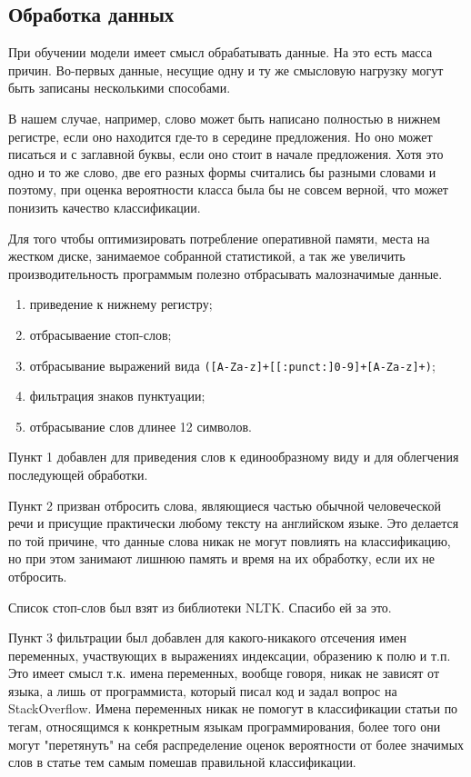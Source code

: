 \documentclass[12pt,a4paper]{scrartcl}
\begin{document}
\subsection*{Обработка данных}

При обучении модели имеет смысл обрабатывать данные. На это есть масса причин.
Во-первых данные, несущие одну и ту же смысловую нагрузку могут быть записаны несколькими способами. 

В нашем случае, например, слово может быть написано полностью в нижнем регистре, если оно находится где-то в середине предложения. Но оно может писаться и с заглавной буквы, если оно стоит в начале предложения. Хотя это одно и то же слово, две его разных формы считались бы разными словами и поэтому, при оценка вероятности класса была бы не совсем верной, что может понизить качество классификации.

Для того чтобы оптимизировать потребление оперативной памяти, места на жестком диске, занимаемое собранной статистикой, а так же увеличить производительность программым полезно отбрасывать малозначимые данные.

\begin{enumerate}
    \item приведение к нижнему регистру;
    \item отбрасываение стоп-слов;
    \item отбрасывание выражений вида \verb|([A-Za-z]+[[:punct:]0-9]+[A-Za-z]+)|;
    \item фильтрация знаков пунктуации;
    \item отбрасывание слов длинее 12 символов.
\end{enumerate}

Пункт 1 добавлен для приведения слов к единообразному виду и для облегчения последующей обработки.

Пункт 2 призван отбросить слова, являющиеся частью обычной человеческой речи и присущие практически любому тексту на английском языке. Это делается по той причине, что данные слова никак не могут повлиять на классификацию, но при этом занимают лишнюю память и время на их обработку, если их не отбросить.

Список стоп-слов был взят из библиотеки NLTK. Спасибо ей за это.

Пункт 3 фильтрации был добавлен для какого-никакого отсечения имен переменных, участвующих в выражениях индексации, образению к полю и т.п. Это имеет смысл т.к. имена переменных, вообще говоря, никак не зависят от языка, а лишь от программиста, который писал код и задал вопрос на StackOverflow. Имена переменных никак не помогут в классификации статьи по тегам, относящимся к конкретным языкам программирования, более того они могут "перетянуть" на себя распределение оценок вероятности от более значимых слов в статье тем самым помешав правильной классификации.
\end{document}
